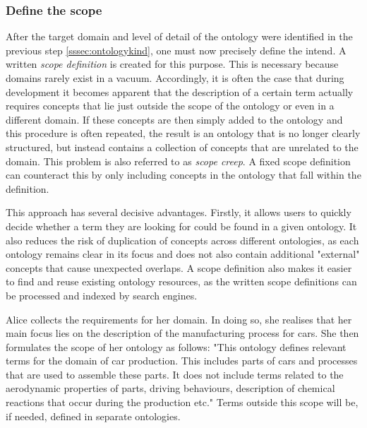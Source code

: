\subsubsection{Define the scope}
\label{sssec:define_scope}

After the target domain and level of detail of the ontology were identified in the previous step \ref{sssec:ontologykind}, one must now precisely define the intend. A written \textit{scope definition} is created for this purpose. This is necessary because domains rarely exist in a vacuum. Accordingly, it is often the case that during development it becomes apparent that the description of a certain term actually requires concepts that lie just outside the scope of the ontology or even in a different domain. If these concepts are then simply added to the ontology and this procedure is often repeated, the result is an ontology that is no longer clearly structured, but instead contains a collection of concepts that are unrelated to the domain. This problem is also referred to as \textit{scope creep}. A fixed scope definition can counteract this by only including concepts in the ontology that fall within the definition.

This approach has several decisive advantages. Firstly, it allows users to quickly decide whether a term they are looking for could be found in a given ontology. It also reduces the risk of duplication of concepts across different ontologies, as each ontology remains clear in its focus and does not also contain additional "external" concepts that cause unexpected overlaps. A scope definition also makes it easier to find and reuse existing ontology resources, as the written scope definitions can be processed and indexed by search engines.

\begin{example}

Alice collects the requirements for her domain. In doing so, she realises that her main focus lies on the description of the manufacturing process for cars. She then formulates the scope of her ontology as follows: "This ontology defines relevant terms for the domain of car production. This includes parts of cars and processes that are used to assemble these parts. It does not include terms related to the aerodynamic properties of parts, driving behaviours, description of chemical reactions that occur during the production etc." Terms outside this scope will be, if needed, defined in separate ontologies.

\end{example}

